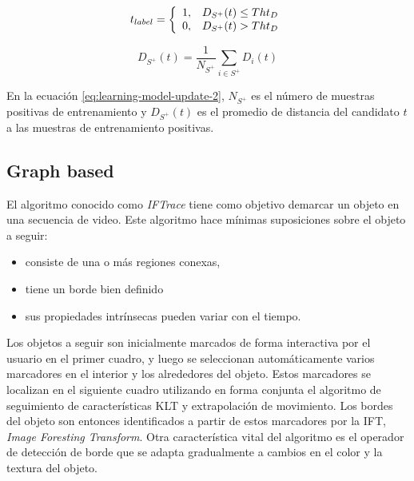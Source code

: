 \documentclass[a4paper,10pt]{article}
\begin{document}
\begin{equation}
    \label{eq:learning-model-update-1}
    t_{label} = \left\{
                \begin{array}{l l}
                    1, & D_{S^{+}}(t) \leq Tht_{D}\\
                    0, & D_{S^{+}}(t) >  Tht_{D}
                \end{array} \right.
\end{equation}

\begin{equation}
    \label{eq:learning-model-update-1}
    D_{S^{+}}(t) = \dfrac{1}{N_{S^{+}}} \sum_{i \in S^{+}} D_{i}(t)
\end{equation}

En la ecuación \ref{eq:learning-model-update-2}, $N_{S^{+}}$ es el
número de muestras positivas de entrenamiento y $D_{S^{+}}(t)$
es el promedio de distancia del candidato $t$ a las muestras
de entrenamiento positivas.

\subsection{Graph based}

El algoritmo conocido como \textit{IFTrace} \cite{IFTrace} tiene como objetivo demarcar un objeto en una secuencia de video. Este algoritmo hace mínimas
suposiciones sobre el objeto a seguir:

\begin{itemize}
    \item consiste de una o más regiones conexas,
    \item tiene un borde bien definido
    \item sus propiedades intrínsecas pueden variar con el tiempo.
\end{itemize}

Los objetos a seguir son inicialmente marcados de forma interactiva por el usuario en el primer cuadro, y luego se seleccionan automáticamente
varios marcadores en el interior y los alrededores del objeto. Estos marcadores se localizan en el siguiente cuadro utilizando en forma
conjunta el algoritmo de
seguimiento de características KLT \cite{KLT} y extrapolación de movimiento. Los bordes del objeto son entonces identificados a partir de estos marcadores por la IFT,
\textit{Image Foresting Transform}\cite{IFT}. Otra característica vital del algoritmo es el operador de detección de borde que se adapta gradualmente a cambios en el
color y la textura del objeto. \\
\end{document}
